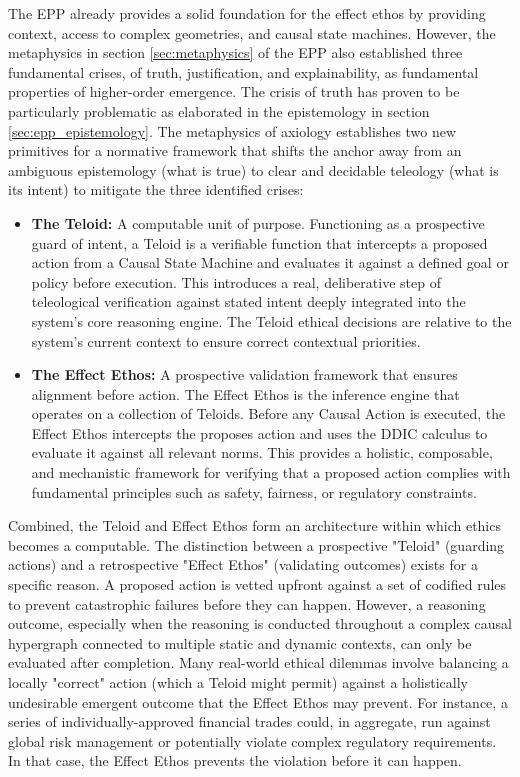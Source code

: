 The EPP already provides a solid foundation for the effect ethos by providing context, access to complex geometries, and causal state machines. However, the metaphysics in section \ref{sec:metaphysics} of the EPP also established three fundamental crises, of truth, justification, and explainability, as fundamental properties of higher-order emergence.  The crisis of truth has proven to be particularly problematic as elaborated in the epistemology in section \ref{sec:epp_epistemology}. The metaphysics of axiology establishes two new primitives for a normative framework that shifts the  anchor away from an ambiguous epistemology (what is true) to clear and decidable teleology (what is its intent) to mitigate the three identified crises:

\begin{itemize}
    \item \textbf{The Teloid:} A computable unit of purpose. Functioning as a prospective guard of intent, a Teloid is a verifiable function that intercepts a proposed action from a Causal State Machine and evaluates it against a defined
  goal or policy before execution. This introduces a real, deliberative step of teleological verification against stated
  intent deeply integrated into the system's core reasoning engine. The Teloid ethical decisions are relative to the system's current context to ensure correct contextual priorities. 
  
    \item \textbf{The Effect Ethos:}  A prospective validation framework that ensures alignment before action. The Effect Ethos is the inference engine that operates on a collection of Teloids. Before any Causal Action is executed, the Effect Ethos intercepts the proposes action and uses the DDIC calculus to evaluate it against all relevant norms. This provides a holistic, composable, and mechanistic framework for verifying that a proposed action complies with fundamental principles such as safety, fairness, or regulatory constraints.
\end{itemize}


Combined, the Teloid and Effect Ethos form an architecture within which ethics becomes a computable. 
The distinction between a prospective "Teloid" (guarding actions) and a retrospective "Effect Ethos"
(validating outcomes) exists for a specific reason. A proposed action is vetted upfront against a set of codified rules to prevent catastrophic failures before they can happen. However, a reasoning outcome, especially when the reasoning is conducted throughout a complex causal hypergraph connected to multiple static and dynamic contexts, can only be evaluated after completion. Many real-world ethical dilemmas involve balancing a locally "correct" action (which a Teloid might permit) against a holistically undesirable emergent outcome that the Effect Ethos may prevent. For instance, a series of individually-approved financial trades could, in aggregate, run against global risk management or potentially violate complex regulatory requirements. In that case, the Effect Ethos prevents the violation before it can happen. 

